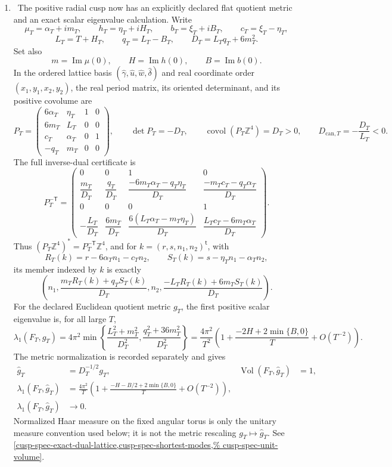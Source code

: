 \begin{enumerate}[leftmargin=1.8em]
\item \Verified\ The positive radial cusp now has an explicitly declared
flat quotient metric and an exact scalar eigenvalue calculation.  Write
\[
 \mu_T=\alpha_T+i m_T,\qquad h_T=\eta_T+i H_T,\qquad
 b_T=\xi_T+i B_T,\qquad c_T=\xi_T-\eta_T,
\]
\[
 L_T=T+H_T,\qquad q_T=L_T-B_T,\qquad
 D_T=L_Tq_T+6m_T^2.
\]
Set also
\[
 m=\operatorname{Im}\mu(0),\qquad
 H=\operatorname{Im}h(0),\qquad
 B=\operatorname{Im}b(0).
\]
In the ordered lattice basis
\((\widehat\gamma,\widehat u,\widehat w,\widehat\delta)\)
and real coordinate order \((x_1,y_1,x_2,y_2)\), the real period
matrix, its oriented determinant, and its positive covolume are
\[
 P_T=
 \begin{pmatrix}
  6\alpha_T&\eta_T&1&0\\
  6m_T&L_T&0&0\\
  c_T&\alpha_T&0&1\\
  -q_T&m_T&0&0
 \end{pmatrix},\qquad
 \det P_T=-D_T,\qquad
 \operatorname{covol}(P_T\mathbb Z^4)=D_T>0,\qquad
 D_{\mathrm{can},T}=-\frac{D_T}{L_T}<0.
\]
The full inverse-dual certificate is
\[
 P_T^{-\mathsf T}=
 \begin{pmatrix}
 0&0&1&0\\[2pt]
 \dfrac{m_T}{D_T}&\dfrac{q_T}{D_T}&
 \dfrac{-6m_T\alpha_T-q_T\eta_T}{D_T}&
 \dfrac{-m_Tc_T-q_T\alpha_T}{D_T}\\[7pt]
 0&0&0&1\\[2pt]
 -\dfrac{L_T}{D_T}&\dfrac{6m_T}{D_T}&
 \dfrac{6(L_T\alpha_T-m_T\eta_T)}{D_T}&
 \dfrac{L_Tc_T-6m_T\alpha_T}{D_T}
 \end{pmatrix}.
\]
Thus \((P_T\mathbb Z^4)^*=P_T^{-\mathsf T}\mathbb Z^4\), and for
\(k=(r,s,n_1,n_2)^{\mathsf t}\), with
\[
 R_T(k)=r-6\alpha_Tn_1-c_Tn_2,\qquad
 S_T(k)=s-\eta_Tn_1-\alpha_Tn_2,
\]
its member indexed by \(k\) is exactly
\[
 \left(n_1,
 \frac{m_TR_T(k)+q_TS_T(k)}{D_T},n_2,
 \frac{-L_TR_T(k)+6m_TS_T(k)}{D_T}\right).
\]
For the declared Euclidean quotient metric \(g_T\), the first positive
scalar eigenvalue is, for all large \(T\),
\[
 \lambda_1(F_T,g_T)
 =4\pi^2\min\left\{
 \frac{L_T^2+m_T^2}{D_T^2},
 \frac{q_T^2+36m_T^2}{D_T^2}\right\}
 =\frac{4\pi^2}{T^2}\left(
 1+\frac{-2H+2\min\{B,0\}}{T}+O(T^{-2})\right).
\]
The metric normalization is recorded separately and gives
\[
 \begin{aligned}
 \widehat g_T&=D_T^{-1/2}g_T,&
 \operatorname{Vol}(F_T,\widehat g_T)&=1,\\
 \lambda_1(F_T,\widehat g_T)
 &=\frac{4\pi^2}{T}\left(
  1+\frac{-H-B/2+2\min\{B,0\}}{T}+O(T^{-2})\right),\\
 \lambda_1(F_T,\widehat g_T)&\longrightarrow0.
 \end{aligned}
\]
Normalized Haar measure on the fixed angular torus is only the unitary
measure convention used below; it is not the metric rescaling
\(g_T\mapsto\widehat g_T\).  See
 \cref{cusp-spec-exact-dual-lattice,cusp-spec-shortest-modes,%
 cusp-spec-unit-volume}.


\end{enumerate}
